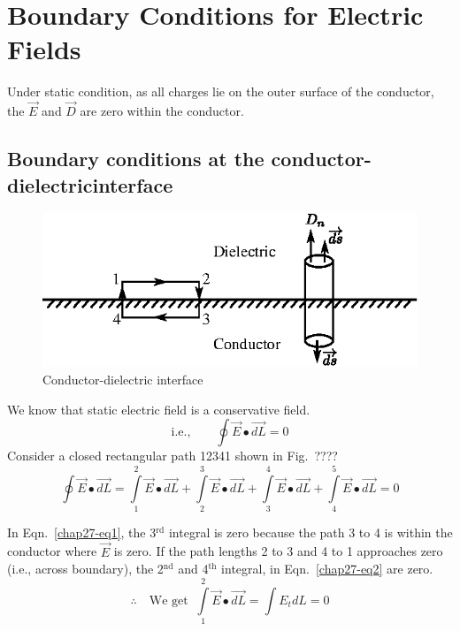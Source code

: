 \setcounter{chapter}{26}
\chapter{Boundary Conditions for Electric Fields}\label{chap27}

Under static condition, as all charges lie on the outer surface of the conductor, the $\overrightarrow{E}$ and $\overrightarrow{D}$ are zero within the conductor.

\section{Boundary conditions at the conductor-dielectric\break interface}
\begin{figure}[H]
\centering
\includegraphics[scale=1.1]{images/fig1.eps}
\caption{Conductor-dielectric interface}\label{chap27-fig1}
\end{figure}

We know that static electric field is a conservative field. 
$$
\text{i.e.,}\qquad \oint \overrightarrow{E} \bullet \overrightarrow{dL} = 0
$$
Consider a closed rectangular path 12341 shown in Fig.~????
\begin{equation*}
\oint \overrightarrow{E} \bullet \overrightarrow{dL} = \int\limits_{1}^{2} \overrightarrow{E} \bullet \overrightarrow{dL} + \int\limits_{2}^{3} \overrightarrow{E} \bullet \overrightarrow{dL} + \int\limits_{3}^{4} \overrightarrow{E} \bullet \overrightarrow{dL} + \int\limits_{4}^{5} \overrightarrow{E} \bullet \overrightarrow{dL} = 0\label{chap27-eq1}
\end{equation*}

In Eqn.~\eqref{chap27-eq1}, the 3$^{\text{rd}}$ integral is zero because the path 3 to 4 is within the conductor where $\overrightarrow{E}$ is zero. If the path lengths 2 to 3 and 4 to 1 approaches zero (i.e., across boundary), the 2$^{\text{nd}}$ and 4$^{\text{th}}$ integral, in Eqn.~\eqref{chap27-eq2} are zero.
\begin{equation*}
\therefore\quad \text{We get } \ \int\limits_{1}^{2} \overrightarrow{E} \bullet \overrightarrow{dL} = \int E_{t}dL = 0\label{chap27-eq2}
\end{equation*}

